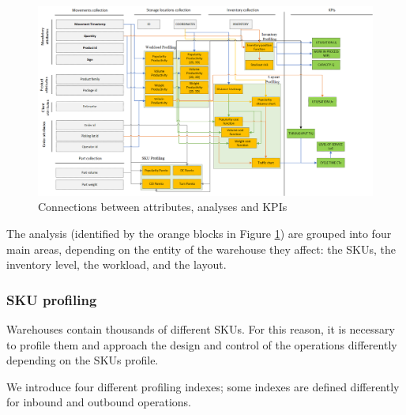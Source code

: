 \begin{landscape}
\thispagestyle{empty}
\begin{figure}[hbt!]
\centering
\includegraphics[width=1.5\textwidth]{SectionWarehouses/control_figures/fig_diagnosis_wh_DataDriven.png}
\captionsetup{type=figure}
\caption{Connections between attributes, analyses and KPIs}
\label{fig_diagnosis_wh_DataDriven}
\end{figure}
\end{landscape}

The analysis (identified by the orange blocks in Figure \ref{fig_diagnosis_wh_DataDriven}) are grouped into four main areas, depending on the entity of the warehouse they affect: the SKUs, the inventory level, the workload, and the layout.

\subsubsection{SKU profiling}
Warehouses contain thousands of different SKUs. For this reason, it is necessary to profile them and approach the design and control of the operations differently depending on the SKUs profile. \par

We introduce four different profiling indexes; some indexes are defined differently for inbound and outbound operations.

